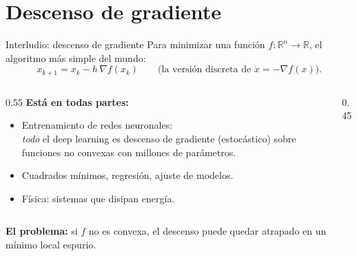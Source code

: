 \documentclass[10pt,aspectratio=169]{beamer}
\newcommand{\R}{\mathbb{R}}
\begin{document}
\section{Descenso de gradiente}

\begin{frame}{Interludio: descenso de gradiente}
Para minimizar una función $f:\R^n\to\R$, el algoritmo más simple del mundo:
\[
x_{k+1} = x_k - h\,\nabla f(x_k)
\qquad \text{(la versión discreta de } \dot x = -\nabla f(x)\text{)}.
\]
\pause
\begin{columns}
\begin{column}{0.55\textwidth}
\textbf{Está en todas partes:}
\begin{itemize}
    \item Entrenamiento de redes neuronales:\\ \emph{todo} el deep learning es descenso de gradiente (estocástico) sobre funciones no convexas con millones de parámetros.
    \item Cuadrados mínimos, regresión, ajuste de modelos.
    \item Física: sistemas que disipan energía.
\end{itemize}
\end{column}
\begin{column}{0.45\textwidth}
\end{column}
\end{columns}
\pause
\medskip
\textbf{El problema:} si $f$ no es convexa, el descenso puede quedar atrapado en un mínimo local espurio.
\end{frame}
\end{document}
